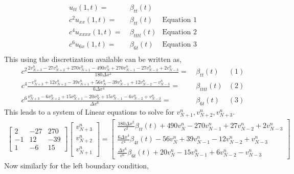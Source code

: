 \documentclass[11pt]{article}
\newcommand{\dx}{\Delta x}
\newcommand{\vd}[2]{v^{#1}_{#2}}
\newcommand{\vnd}[1]{v^{n}_{#1}}
\begin{document}
\begin{enumerate}
\begin{enumerate}
\begin{align*}
          u_{tt}(1,t) =& \ \beta_{tt}(t) \\
          c^2 u_{xx}(1,t) =& \ \beta_{tt}(t) & \text{Equation 1} \\
          c^4 u_{xxxx}(1,t) =& \ \beta_{tttt}(t) & \text{Equation 2}\\
          c^6 u_{6x}(1,t) =& \ \beta_{6t}(t) & \text{Equation 3} \\
      \end{align*}
      This using the discretization available can be written as,
      \begin{align*}
          c^2 \frac{2\vd{n}{N+3}-27\vd{n}{N+2}+270\vd{n}{N+1}-490\vd{n}{N}+270\vd{n}{N-1}-27\vd{n}{N-2}+2\vd{n}{N-3}}{180\dx^2} =& \ \beta_{tt}(t) & (1) \\
          c^4 \frac{-\vnd{N+3}+12\vnd{N+2}-39\vnd{N+1}+56\vnd{N}-39\vnd{N-1}+12\vnd{N-2}-\vnd{N-3}}{6\dx^4} =& \ \beta_{tttt}(t) & (2)\\
          c^6 \frac{\vnd{N+3}-6\vnd{N+2}+15\vnd{N+1}-20\vnd{N}+15\vnd{N-1}-6\vnd{N-2}+\vnd{N-3}}{\dx^6} =& \ \beta_{6t}(t) & (3)
      \end{align*}
      This leads to a system of Linear equations to solve for $\vnd{N+1},\vnd{N+2},\vnd{N+3}$. \\
      \begin{align*}
          \begin{bmatrix}
                2 & -27 & 270 \\
                -1 & 12 & -39 \\
                1 & -6  & 15
          \end{bmatrix} 
          \begin{bmatrix}
                \vnd{N+3}\\
                \vnd{N+2}\\
                \vnd{N+1}
          \end{bmatrix}=
          \begin{bmatrix}
                \frac{180\dx^2}{c^2}\beta_{tt}(t)+490\vnd{N}-270\vnd{N-1}+27\vnd{N-2}+2\vnd{N-3}\\
                \frac{6\dx^4}{c^4}\beta_{4t}(t) -56\vnd{N}+39\vnd{N-1}-12\vnd{N-2}+\vnd{N-3}\\
                \frac{\dx^6}{c^6}\beta_{6t}(t)+20\vnd{N}-15\vnd{N-1}+6\vnd{N-2}-\vnd{N-3}
          \end{bmatrix}
      \end{align*}
      Now similarly for the left boundary condition, 
      \begin{align*}

\end{align*}
\end{enumerate}
\end{enumerate}
\end{document}
